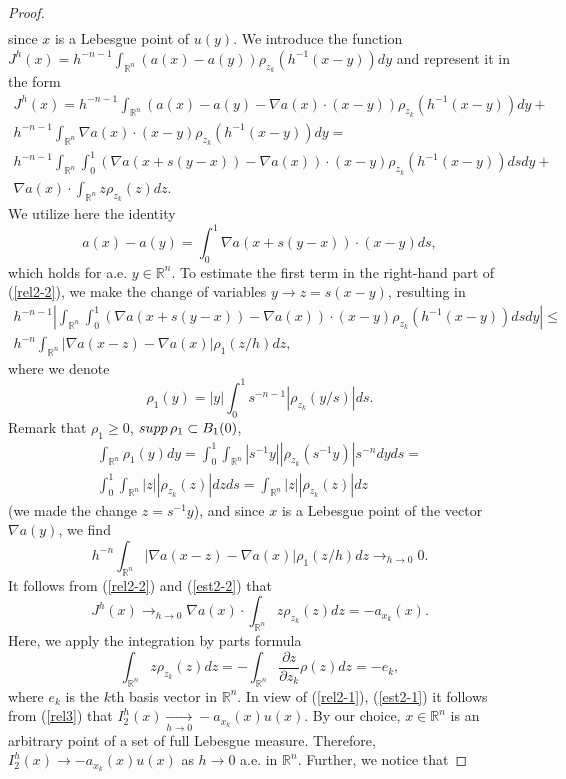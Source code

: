 \documentclass[10pt,a4paper]{amsart}
\numberwithin{equation}{section}
\newcommand{\R}{{\mathbb R}}
\newcommand{\supp}{\mathop{\rm supp}}
\begin{document}
\begin{proof}
\begin{align}
\end{align}
since $x$ is a Lebesgue point of $u(y)$. We introduce the function ${\displaystyle J^h(x)=h^{-n-1}\int_{\R^n}(a(x)-a(y))\rho_{z_k}(h^{-1}(x-y))dy}$ and represent it in the form
\begin{align}\label{rel2-2}
J^h(x)=h^{-n-1}\int_{\R^n}(a(x)-a(y)-\nabla a(x)\cdot(x-y))\rho_{z_k}(h^{-1}(x-y))dy+\nonumber\\ h^{-n-1}\int_{\R^n}\nabla a(x)\cdot (x-y)\rho_{z_k}(h^{-1}(x-y))dy=\nonumber\\
h^{-n-1}\int_{\R^n}\int_0^1 (\nabla a(x+s(y-x))-\nabla a(x))\cdot(x-y)\rho_{z_k}(h^{-1}(x-y))dsdy+\nonumber\\ \nabla a(x)\cdot\int_{\R^n}z\rho_{z_k}(z)dz.
\end{align}
We utilize here the identity
\[
a(x)-a(y)=\int_0^1\nabla a(x+s(y-x))\cdot(x-y)ds,
\]
which holds for a.e. $y\in\R^n$.
To estimate the first term in the right-hand part of (\ref{rel2-2}), we make the change of variables $y\to z=s(x-y)$, resulting in
\begin{align}\label{est2-2}
h^{-n-1}\left|\int_{\R^n}\int_0^1 (\nabla a(x+s(y-x))-\nabla a(x))\cdot(x-y)\rho_{z_k}(h^{-1}(x-y))dsdy\right|\le\nonumber\\
h^{-n}\int_{\R^n} |\nabla a(x-z)-\nabla a(x)|\rho_1(z/h)dz,
\end{align}
where we denote
\[
\rho_1(y)=|y|\int_0^1s^{-n-1}|\rho_{z_k}(y/s)|ds.
\]
Remark that $\rho_1\ge 0$, $\supp\rho_1\subset B_1(0)$, 
\begin{align*}
\int_{\R^n}\rho_1(y)dy=\int_0^1\int_{\R^n} |s^{-1}y||\rho_{z_k}(s^{-1}y)|s^{-n}dyds= \\ \int_0^1\int_{\R^n}|z||\rho_{z_k}(z)|dz ds=\int_{\R^n}|z||\rho_{z_k}(z)|dz
\end{align*}
(we made the change $z=s^{-1}y$), and since $x$ is a Lebesgue point of the vector $\nabla a(y)$, we find
\[h^{-n}\int_{\R^n} |\nabla a(x-z)-\nabla a(x)|\rho_1(z/h)dz\mathop{\to}_{h\to 0} 0.\]
It follows from (\ref{rel2-2}) and (\ref{est2-2}) that
\begin{equation} \label{rel3}
J^h(x)\mathop{\to}_{h\to 0} \nabla a(x)\cdot\int_{\R^n}z\rho_{z_k}(z)dz=-a_{x_k}(x).
\end{equation}
Here, we apply the integration by parts formula
\[\int_{\R^n}z\rho_{z_k}(z)dz=-\int_{\R^n}\frac{\partial z}{\partial z_k}\rho(z)dz=-e_k, \]
where $e_k$ is the $k$th basis vector in $\R^n$.
In view of (\ref{rel2-1}), (\ref{est2-1}) it follows from (\ref{rel3}) that $I_2^h(x)\mathop{\to}\limits_{h\to 0} -a_{x_k}(x)u(x)$. By our choice, $x\in\R^n$ is an arbitrary point of a set of full Lebesgue measure. Therefore, $I_2^h(x)\to -a_{x_k}(x)u(x)$ as $h\to 0$ a.e. in $\R^n$. Further, we notice that

\end{proof}
\end{document}
